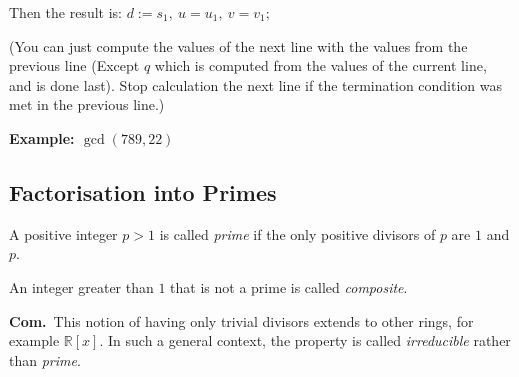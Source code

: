 \documentclass[a4paper]{extarticle}
\newcommand{\Com}{\textbf{Com.}\ }
\newcommand{\R}{\mathbb{R}}
\begin{document}
\begin{multicols*}{2}
Then the result is: $d:=s_1, \ u=u_1, \ v=v_1;$

(You can just compute the values of the next line with the values from the
previous line (Except $q$ which is computed from the values of the current
line, and is done last).
Stop calculation the next line if the termination condition was met in the
 previous line.)

\textbf{Example: $\gcd(789,22)$}



\subsection{Factorisation into Primes}

\Def[Prime] A positive integer $p>1$ is called \emph{prime} if the only positive
divisors of $p$ are $1$ and $p$.

\Def[Composite]  An integer greater than $1$ that is not a prime
is called \emph{composite}.

\Com This notion of having only trivial divisors extends to other rings, for
example $\R[x]$. In such a general context, the property is called \emph{irreducible}
rather than \emph{prime}. 


\end{multicols*}
\end{document}
